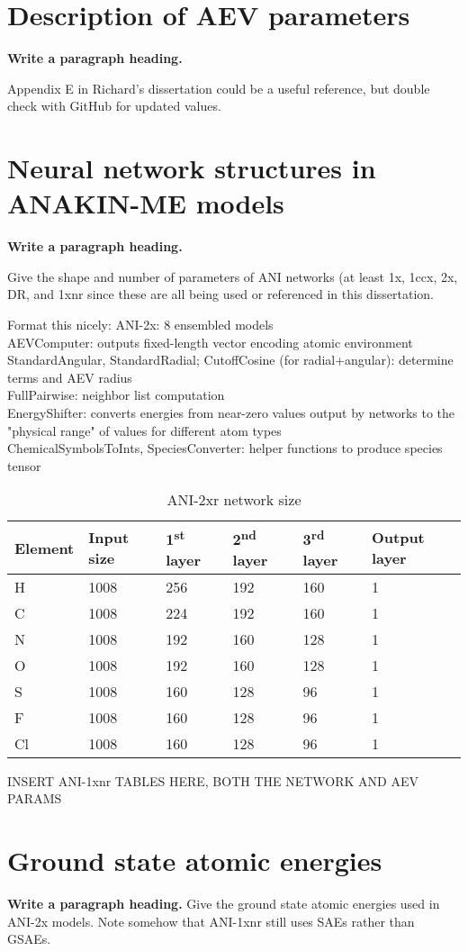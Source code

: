 \chapter{Description of AEV parameters}
\label{appendix:AEV_param}
{\bf Write a paragraph heading.}

Appendix E in Richard's dissertation could be a useful reference, but double check with GitHub for updated values.


\chapter{Neural network structures in ANAKIN-ME models}
\label{appendix:NN_arch}
{\bf Write a paragraph heading.}

Give the shape and number of parameters of ANI networks (at least 1x, 1ccx, 2x, DR, and 1xnr since these are all being used or referenced in this dissertation. 


Format this nicely:
ANI-2x: 8 ensembled models \\
AEVComputer: outputs fixed-length vector encoding atomic environment \\
StandardAngular, StandardRadial; CutoffCosine (for radial+angular): determine terms and AEV radius \\
FullPairwise: neighbor list computation\\
EnergyShifter: converts energies from near-zero values output by networks to the "physical range" of values for different atom types \\
ChemicalSymbolsToInts, SpeciesConverter: helper functions to produce species tensor \\

\begin{table}[hb!]
    \caption{ANI-2xr network size}
    \begin{tabularx}{\textwidth}{XXXXXX}\hline
    \textbf{Element} & \textbf{Input size}  & \textbf{1\textsuperscript{st} layer}  & \textbf{2\textsuperscript{nd} layer} & \textbf{3\textsuperscript{rd} layer} & \textbf{Output layer}\\\hline
    H & 1008 & 256 & 192 & 160 & 1 \\
    C & 1008 & 224 & 192 & 160 & 1 \\
    N & 1008 & 192 & 160 & 128 & 1 \\
    O & 1008 & 192 & 160 & 128 & 1 \\
    S & 1008 & 160 & 128 & 96 & 1 \\
    F & 1008 & 160 & 128 & 96 & 1 \\
    Cl & 1008 & 160 & 128 & 96 & 1 \\\hline
    \end{tabularx}
\end{table}



INSERT ANI-1xnr TABLES HERE, BOTH THE NETWORK AND AEV PARAMS



\chapter{Ground state atomic energies}
\label{appendix:GSAEs}
{\bf Write a paragraph heading.} Give the ground state atomic energies used in ANI-2x models.
Note somehow that ANI-1xnr still uses SAEs rather than GSAEs.
